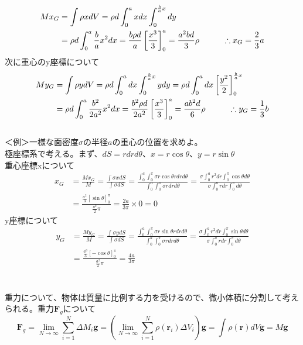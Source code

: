 \documentclass{jsarticle}
\begin{document}
\begin{align*}
Mx_{G}&=\int\rho xdV=\rho d\int_{0}^{a}xdx\int_{0}^{\frac{b}{a}x}dy\\
&=\rho d\int_{0}^{a}\frac{b}{a}x^{2}dx=\frac{b\rho d}{a}\left[\frac{x^3}{3}\right]_{0}^{a}=\frac{a^{2}bd}{3}\rho\hspace{10mm}\therefore x_{G}=\frac{2}{3}a
\end{align*}
次に重心のy座標について
\begin{align*}
My_{G}&=\int\rho ydV=\rho d\int_{0}^{a}dx\int_{0}^{\frac{b}{a}x}ydy=\rho d\int_{0}^{a}dx\left[\frac{y^2}{2}\right]_{0}^{\frac{b}{a}x}\\
&=\rho d\int_{0}^{a}\frac{b^2}{2a^2}x^{2}dx=\frac{b^2\rho d}
{2a^2}\left[\frac{x^3}{3}\right]_{0}^{a}=\frac{ab^{2}d}{6}\rho\hspace{10mm}\therefore y_{G}=\frac{1}{3}b
\end{align*}
\\
＜例＞一様な面密度\(\sigma\)の半径\(a\)の重心の位置を求めよ。\\
極座標系で考える。まず、\(dS=rdrd\theta\)、\(x=r\cos\theta\)、\(y=r\sin\theta\)\\
重心座標xについて
\begin{align*}
\displaystyle
x_{G}&=\frac{Mx_{G}}{M}=\frac{\int\sigma xdS}{\int\sigma dS}=\frac{\int_{0}^{a}\int_{0}^{\pi}\sigma r\cos\theta rdrd\theta}{\int_{0}^{a}\int_{0}^{\pi}\sigma rdrd\theta}=\frac{\sigma\int_{0}^{a}r^{2}dr\int_{0}^{\pi}\cos\theta d\theta}{\sigma\int_{0}^{a}rdr\int_{0}^{\pi}d\theta}\\
&=\frac{\frac{a^{2}}{3}\left[\sin\theta\right]_{0}^{\pi}}{\frac{a^{2}}{2}\pi}=\frac{2a}{3\pi}\times0=0
\end{align*}
y座標について
\begin{align*}
\displaystyle
y_{G}&=\frac{My_{G}}{M}=\frac{\int\sigma ydS}{\int\sigma dS}=\frac{\int_{0}^{a}\int_{0}^{\pi}\sigma r\sin\theta rdrd\theta}{\int_{0}^{a}\int_{0}^{\pi}\sigma rdrd\theta}=\frac{\sigma\int_{0}^{a}r^{2}dr\int_{0}^{\pi}\sin\theta d\theta}{\sigma\int_{0}^{a}rdr\int_{0}^{\pi}d\theta}\\
&=\frac{\frac{a^{3}}{3}\left[-\cos\theta\right]_{0}^{\pi}}{\frac{a^2}{2}\pi}=\frac{4a}{3\pi}
\end{align*}
\\
\\
重力について、物体は質量に比例する力を受けるので、微小体積に分割して考えられる。重力\(\bm{F}_{g}\)について
\begin{equation}
\displaystyle
\bm{F}_{g}=\lim_{N\to\infty}\sum_{i=1}^{N}\Delta M_{i}\bm{g}=\left(\lim_{N\to\infty}\sum_{i=1}^{N}\rho(\bm{r}_{i})\Delta V_{i}\right)\bm{g}=\int\rho(\bm{r})dV\bm{g}=M\bm{g}
\end{equation}
\end{document}
